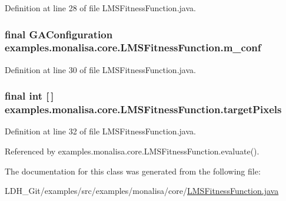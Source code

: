 Definition at line 28 of file L\-M\-S\-Fitness\-Function.\-java.

\hypertarget{classexamples_1_1monalisa_1_1core_1_1_l_m_s_fitness_function_ace663d223d2211f6b36dec386165a4c4}{
\subsubsection[{m\-\_\-conf}]{\setlength{\rightskip}{0pt plus 5cm}final {\bf G\-A\-Configuration} examples.\-monalisa.\-core.\-L\-M\-S\-Fitness\-Function.\-m\-\_\-conf\hspace{0.3cm}{\ttfamily [private]}}}\label{classexamples_1_1monalisa_1_1core_1_1_l_m_s_fitness_function_ace663d223d2211f6b36dec386165a4c4}


Definition at line 30 of file L\-M\-S\-Fitness\-Function.\-java.

\hypertarget{classexamples_1_1monalisa_1_1core_1_1_l_m_s_fitness_function_a54bc6cab3cf77148b2a44fba8418aabb}{
\subsubsection[{target\-Pixels}]{\setlength{\rightskip}{0pt plus 5cm}final int \mbox{[}$\,$\mbox{]} examples.\-monalisa.\-core.\-L\-M\-S\-Fitness\-Function.\-target\-Pixels\hspace{0.3cm}{\ttfamily [private]}}}\label{classexamples_1_1monalisa_1_1core_1_1_l_m_s_fitness_function_a54bc6cab3cf77148b2a44fba8418aabb}


Definition at line 32 of file L\-M\-S\-Fitness\-Function.\-java.



Referenced by examples.\-monalisa.\-core.\-L\-M\-S\-Fitness\-Function.\-evaluate().



The documentation for this class was generated from the following file\-:\begin{DoxyCompactItemize}
\item 
L\-D\-H\-\_\-\-Git/examples/src/examples/monalisa/core/\hyperlink{monalisa_2core_2_l_m_s_fitness_function_8java}{L\-M\-S\-Fitness\-Function.\-java}\end{DoxyCompactItemize}
